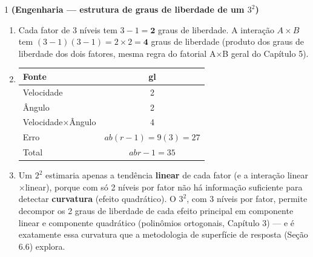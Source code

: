 \documentclass[11pt]{article}
\begin{document}

\begin{questao}{1} \textbf{(Engenharia --- estrutura de graus de liberdade de um $3^2$)}
\end{questao}
\begin{solucao}
\begin{enumerate}[label=(\alph*)]
  \item Cada fator de 3 níveis tem $3-1=\mathbf{2}$ graus de liberdade. A interação
    $A{\times}B$ tem $(3-1)(3-1)=2\times2=\mathbf{4}$ graus de liberdade (produto dos graus de
    liberdade dos dois fatores, mesma regra do fatorial A×B geral do Capítulo 5).
  \item
  \begin{center}
  \begin{tabular}{lc}
  \toprule
  Fonte & gl \\ \midrule
  Velocidade & 2 \\
  Ângulo & 2 \\
  Velocidade$\times$Ângulo & 4 \\
  Erro & $ab(r-1) = 9(3) = 27$ \\
  Total & $abr-1 = 35$ \\ \bottomrule
  \end{tabular}
  \end{center}
  \item Um $2^2$ estimaria apenas a tendência \textbf{linear} de cada fator (e a interação
    linear$\times$linear), porque com só 2 níveis por fator não há informação suficiente para
    detectar \textbf{curvatura} (efeito quadrático). O $3^2$, com 3 níveis por fator, permite
    decompor os 2 graus de liberdade de cada efeito principal em componente linear e componente
    quadrático (polinômios ortogonais, Capítulo 3) --- e é exatamente essa curvatura que a
    metodologia de superfície de resposta (Seção 6.6) explora.
\end{enumerate}
\end{solucao}
\end{document}
